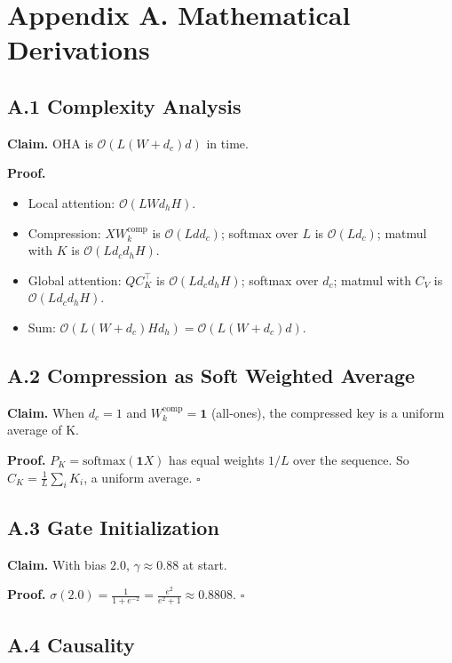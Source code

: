 
\section{Appendix A. Mathematical Derivations}

\subsection{A.1 Complexity Analysis}

\textbf{Claim.} OHA is $\mathcal{O}(L(W + d_c) d)$ in time.

\textbf{Proof.} 
\begin{itemize}
\item Local attention: $\mathcal{O}(L W d_h H)$.
\item Compression: $X W_k^\text{comp}$ is $\mathcal{O}(L d d_c)$; softmax over $L$ is $\mathcal{O}(L d_c)$; matmul with $K$ is $\mathcal{O}(L d_c d_h H)$.
\item Global attention: $Q C_K^\top$ is $\mathcal{O}(L d_c d_h H)$; softmax over $d_c$; matmul with $C_V$ is $\mathcal{O}(L d_c d_h H)$.
\item Sum: $\mathcal{O}(L(W + d_c) H d_h) = \mathcal{O}(L(W + d_c) d)$.

\end{itemize}
\subsection{A.2 Compression as Soft Weighted Average}

\textbf{Claim.} When $d_c = 1$ and $W_k^\text{comp} = \mathbf{1}$ (all-ones), the 
compressed key is a uniform average of K.

\textbf{Proof.} $P_K = \text{softmax}(\mathbf{1} X)$ has equal weights $1/L$ over 
the sequence. So $C_K = \frac{1}{L} \sum_i K_i$, a uniform average. $\square$

\subsection{A.3 Gate Initialization}

\textbf{Claim.} With bias $2.0$, $\gamma \approx 0.88$ at start.

\textbf{Proof.} $\sigma(2.0) = \frac{1}{1 + e^{-2}} = \frac{e^2}{e^2 + 1} \approx 0.8808$. $\square$

\subsection{A.4 Causality}

